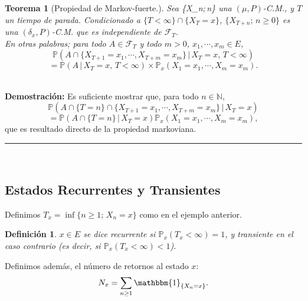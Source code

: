 \documentclass[a4paper]{article}
\newcommand{\prob}{\mathbb{P}}
\newtheorem{definicion}{Definición}
\newtheorem{teorema}{Teorema}
\numberwithin{equation}{subsection}
\def\N{\mathbb N}
\begin{document}
\begin{teorema}[Propiedad de Markov-fuerte.]
Sea \{X_n;\,n\} una $(\mu,P)$-C.M., y $T$ un tiempo de parada. Condicionado a $\{T<\infty\}\cap\{X_T = x\}$, $\{X_{T+n};\,n\geq 0\}$ es una $(\delta_x,P)$-C.M. que es independiente de $\mathcal{F}_T$.\\ \newline
En otras palabras; para todo $A\in \mathcal{F}_T$ y todo $m>0$, $x_1,\cdots,x_m \in E$,
\[\prob\left(A\cap\{X_{T+1}=x_1,\cdots,X_{T+m}=x_m\}\,|\,X_T=x,\,T<\infty\right)\]
\[= \prob\left(A\,|\,X_T = x,\,T<\infty\right)\times\prob_x\left(X_1 = x_1,\cdots,X_m = x_m\right).\]
\end{teorema}\\ \newline
\textbf{Demostración: }Es suficiente mostrar que, para todo $n\in \N$,
\[\prob\left(A\cap\{T=n\}\cap\{X_{T+1}=x_1,\cdots,X_{T+m}=x_m\}\,|\,X_T=x\right)\]
\[= \prob\left(A\cap\{T=n\}\,|\,X_T = x\right)\prob_x\left(X_1 = x_1,\cdots,X_m=x_m\right),\]
que es resultado directo de la propiedad markoviana.\\ \newline
\rule{0.7em}{0.7em}\\ \newline

\subsection{Estados Recurrentes y Transientes }
Definimos $T_x = \inf\{n\geq 1;\,X_n = x\}$ como en  el ejemplo anterior.\\ \newline

\begin{definicion}
$x\in E$ se dice \textit{recurrente} si $\prob_x\left(T_x <\infty\right)=1$, y \textit{transiente} en el caso contrario (es decir, si $\prob_x\left(T_x<\infty\right)<1$).
\end{definicion}
 Definimos además, el número de retornos al estado $x$:
 \[N_x = \sum_{n\geq 1}\mathbbm{1}_{\{X_n = x\}}.\]
 
\end{document}
